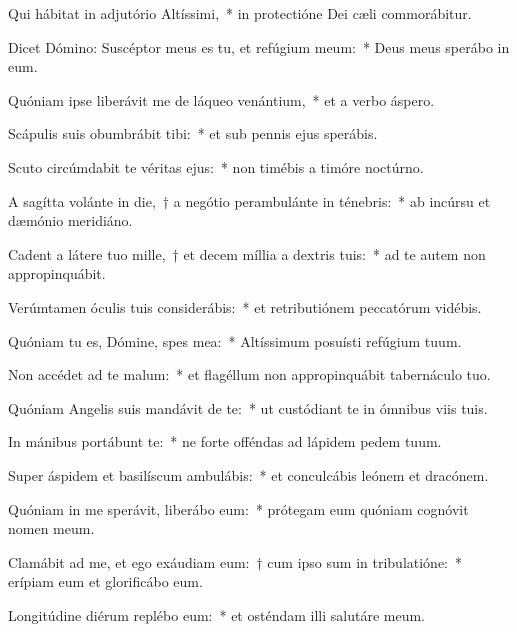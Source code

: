 \item Qui hábitat in adjutório Altíssimi,~* in protectióne Dei cæli commorábitur.

\item Dicet Dómino: Suscéptor meus es tu, et refúgium meum:~* Deus meus sperábo in eum.

\item Quóniam ipse liberávit me de láqueo venántium,~* et a verbo áspero.

\item Scápulis suis obumbrábit tibi:~* et sub pennis ejus sperábis.

\item Scuto circúmdabit te véritas ejus:~* non timébis a timóre noctúrno.

\item A sagítta volánte in die,~† a negótio perambulánte in ténebris:~* ab incúrsu et dæmónio meridiáno.

\item Cadent a látere tuo mille,~† et decem míllia a dextris tuis:~* ad te autem non appropinquábit.

\item Verúmtamen óculis tuis considerábis:~* et retributiónem peccatórum vidébis.

\item Quóniam tu es, Dómine, spes mea:~* Altíssimum posuísti refúgium tuum.

\item Non accédet ad te malum:~* et flagéllum non appropinquábit tabernáculo tuo.

\item Quóniam Angelis suis mandávit de te:~* ut custódiant te in ómnibus viis tuis.

\item In mánibus portábunt te:~* ne forte offéndas ad lápidem pedem tuum.

\item Super áspidem et basilíscum ambulábis:~* et conculcábis leónem et dracónem.

\item Quóniam in me sperávit, liberábo eum:~* prótegam eum quóniam cognóvit nomen meum.

\item Clamábit ad me, et ego exáudiam eum:~† cum ipso sum in tribulatióne:~* erípiam eum et glorificábo eum.

\item Longitúdine diérum replébo eum:~* et osténdam illi salutáre meum.

